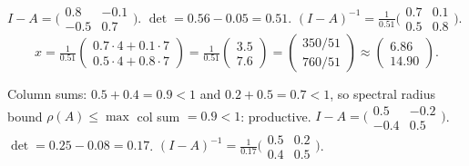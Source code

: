 \begin{solutions}
  \item $I - A = \bigl(\begin{smallmatrix} 0.8 & -0.1 \\ -0.5 & 0.7 \end{smallmatrix}\bigr)$.
        $\det = 0.56 - 0.05 = 0.51$.
        $(I - A)^{-1} = \tfrac{1}{0.51}\bigl(\begin{smallmatrix} 0.7 & 0.1 \\ 0.5 & 0.8 \end{smallmatrix}\bigr)$.
        \[
        x = \tfrac{1}{0.51}\begin{pmatrix} 0.7 \cdot 4 + 0.1 \cdot 7 \\ 0.5 \cdot 4 + 0.8 \cdot 7 \end{pmatrix} = \tfrac{1}{0.51}\begin{pmatrix} 3.5 \\ 7.6 \end{pmatrix} = \begin{pmatrix} 350/51 \\ 760/51 \end{pmatrix} \approx \begin{pmatrix} 6.86 \\ 14.90 \end{pmatrix}.
        \]

  \item Column sums: $0.5 + 0.4 = 0.9 < 1$ and $0.2 + 0.5 = 0.7 < 1$, so
        spectral radius bound $\rho(A) \le \max$ col sum $= 0.9 < 1$:
        productive.
        $I - A = \bigl(\begin{smallmatrix} 0.5 & -0.2 \\ -0.4 & 0.5 \end{smallmatrix}\bigr)$.
        $\det = 0.25 - 0.08 = 0.17$.
        $(I - A)^{-1} = \tfrac{1}{0.17}\bigl(\begin{smallmatrix} 0.5 & 0.2 \\ 0.4 & 0.5 \end{smallmatrix}\bigr)$.


\end{solutions}
